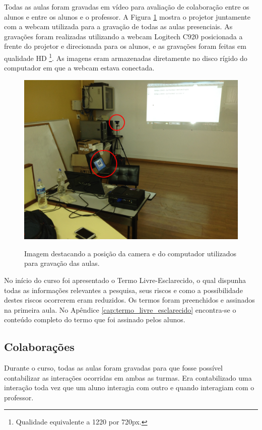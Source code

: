 Todas as aulas foram gravadas em vídeo para avaliação de colaboração entre os alunos e entre os alunos e o professor. A Figura \ref{fig:lab_2} mostra o projetor juntamente com a webcam utilizada para a gravação de todas as aulas presenciais. As gravações foram realizadas utilizando a webcam Logitech C920 posicionada a frente do projetor e direcionada para os alunos, e as gravações foram feitas em qualidade HD \footnote{Qualidade equivalente a 1220 por 720px.}. As imagens eram armazenadas diretamente no disco rígido do computador em que a webcam estava conectada.

\begin{figure}[!h]
\centering
\caption{Imagem destacando a posição da camera e do computador utilizados para gravação das aulas.}
\includegraphics[width=1.0\textwidth]{imgs/lab_2.jpg}
\label{fig:lab_2} 
\end{figure}

No início do curso foi apresentado o Termo Livre-Esclarecido, o qual dispunha todas as informações relevantes a pesquisa, seus riscos e como a possibilidade destes riscos ocorrerem eram reduzidos. Os termos foram preenchidos e assinados na primeira aula. No Apêndice \ref{cap:termo_livre_esclarecido} encontra-se o conteúdo completo do termo que foi assinado pelos alunos.

\subsection{Colaborações}

Durante o curso, todas as aulas foram gravadas para que fosse possível contabilizar as interações ocorridas em ambas as turmas. Era contabilizado uma interação toda vez que um aluno interagia com outro e quando interagiam com o professor.

